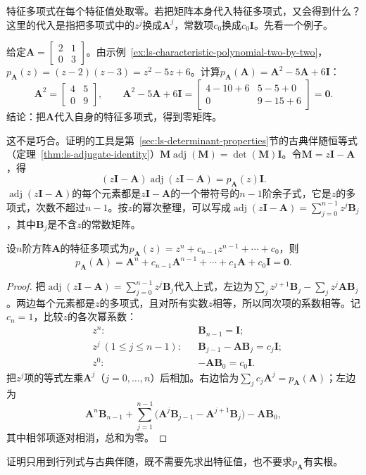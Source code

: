 特征多项式在每个特征值处取零。若把矩阵本身代入特征多项式，又会得到什么？这里的代入是指把多项式中的$z^j$换成$\bm A^j$，常数项$c_0$换成$c_0\bm I$。先看一个例子。
\begin{example}[把矩阵代入它的特征多项式]
\label{ex:ls-cayley-hamilton-two-by-two}
给定$\bm A=\left[\begin{smallmatrix}2&1\\0&3\end{smallmatrix}\right]$。由示例~\ref{ex:ls-characteristic-polynomial-two-by-two}，$p_{\bm A}(z)=(z-2)(z-3)=z^2-5z+6$。计算$p_{\bm A}(\bm A)=\bm A^2-5\bm A+6\bm I$：
\[
 \bm A^2=\begin{bmatrix}4&5\\0&9\end{bmatrix},\qquad
 \bm A^2-5\bm A+6\bm I
 =\begin{bmatrix}4-10+6&5-5+0\\0&9-15+6\end{bmatrix}
 =\bm0 .
\]
结论：把$\bm A$代入自身的特征多项式，得到零矩阵。
\end{example}
这不是巧合。证明的工具是第~\ref{sec:ls-determinant-properties}节的古典伴随恒等式（定理~\ref{thm:ls-adjugate-identity}）$\bm M\operatorname{adj}(\bm M)=\det(\bm M)\bm I$。令$\bm M=z\bm I-\bm A$，得
\[
 (z\bm I-\bm A)\operatorname{adj}(z\bm I-\bm A)=p_{\bm A}(z)\bm I .
\]
$\operatorname{adj}(z\bm I-\bm A)$的每个元素都是$z\bm I-\bm A$的一个带符号的$n-1$阶余子式，它是$z$的多项式，次数不超过$n-1$。按$z$的幂次整理，可以写成$\operatorname{adj}(z\bm I-\bm A)=\sum_{j=0}^{n-1}z^j\bm B_j$，其中$\bm B_j$是不含$z$的常数矩阵。
\begin{theorem}
\label{thm:ls-cayley-hamilton}
设$n$阶方阵$\bm A$的特征多项式为$p_{\bm A}(z)=z^n+c_{n-1}z^{n-1}+\cdots+c_0$，则
\[
 p_{\bm A}(\bm A)
 =\bm A^n+c_{n-1}\bm A^{n-1}+\cdots+c_1\bm A+c_0\bm I=\bm0.
\]
\end{theorem}
\begin{proof}
把$\operatorname{adj}(z\bm I-\bm A)=\sum_{j=0}^{n-1}z^j\bm B_j$代入上式，左边为$\sum_jz^{j+1}\bm B_j-\sum_jz^j\bm A\bm B_j$。两边每个元素都是$z$的多项式，且对所有实数$z$相等，所以同次项的系数相等。记$c_n=1$，比较$z$的各次幂系数：
\[
 \begin{aligned}
 &z^n: &&\bm B_{n-1}=\bm I;\\
 &z^j\ (1\leq j\leq n-1): &&\bm B_{j-1}-\bm A\bm B_j=c_j\bm I;\\
 &z^0: &&-\bm A\bm B_0=c_0\bm I .
 \end{aligned}
\]
把$z^j$项的等式左乘$\bm A^j$（$j=0,\ldots,n$）后相加。右边恰为$\sum_jc_j\bm A^j=p_{\bm A}(\bm A)$；左边为
\[
 \bm A^n\bm B_{n-1}+\sum_{j=1}^{n-1}\bigl(\bm A^j\bm B_{j-1}-\bm A^{j+1}\bm B_j\bigr)-\bm A\bm B_0 ,
\]
其中相邻项逐对相消，总和为零。
\end{proof}
证明只用到行列式与古典伴随，既不需要先求出特征值，也不要求$p_{\bm A}$有实根。

